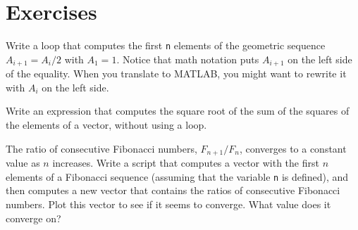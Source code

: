 \section{Exercises}


\begin{ex}
Write a loop that computes the first {\tt n} elements
of the geometric sequence $A_{i+1} = A_i/2$ with $A_1 = 1$.  Notice that
math notation puts $A_{i+1}$ on the left side of the equality.
When you translate to MATLAB, you might want to rewrite it with
$A_{i}$ on the left side.
\end{ex}

\begin{ex}
Write an expression that computes the square root of the sum of the squares of the elements of a vector, without using a loop.

\end{ex}

\begin{ex}
\label{fibratio}

The ratio of consecutive Fibonacci numbers, $F_{n+1}/F_{n}$, converges
to a constant value as $n$ increases.  Write a script that computes
a vector with the first $n$ elements of a Fibonacci sequence (assuming
that the variable {\tt n} is defined), and then computes a new
vector that contains the ratios of consecutive Fibonacci numbers.
Plot this vector to see if it seems to converge.  What value does
it converge on?


\end{ex}

